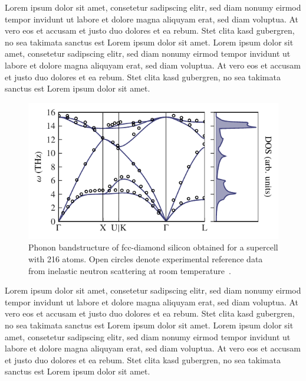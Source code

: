 Lorem ipsum dolor sit amet, consetetur sadipscing elitr, sed diam nonumy eirmod tempor invidunt ut labore et dolore magna aliquyam erat, sed diam voluptua. At vero eos et accusam et justo duo dolores et ea rebum. Stet clita kasd gubergren, no sea takimata sanctus est Lorem ipsum dolor sit amet. Lorem ipsum dolor sit amet, consetetur sadipscing elitr, sed diam nonumy eirmod tempor invidunt ut labore et dolore magna aliquyam erat, sed diam voluptua. At vero eos et accusam et justo duo dolores et ea rebum. Stet clita kasd gubergren, no sea takimata sanctus est Lorem ipsum dolor sit amet.


\begin{figure}
	\includegraphics[width=\textwidth]{./data/plots/anharmonicity/3_bandstructures/Si/bands_dos_emb.pdf}
	\caption{
		Phonon bandstructure of fcc-diamond silicon obtained for a supercell with 216 atoms. Open circles denote experimental reference data from inelastic neutron scattering at room temperature~\cite{Nilsson1972}.
	}
\end{figure}

Lorem ipsum dolor sit amet, consetetur sadipscing elitr, sed diam nonumy eirmod tempor invidunt ut labore et dolore magna aliquyam erat, sed diam voluptua. At vero eos et accusam et justo duo dolores et ea rebum. Stet clita kasd gubergren, no sea takimata sanctus est Lorem ipsum dolor sit amet. Lorem ipsum dolor sit amet, consetetur sadipscing elitr, sed diam nonumy eirmod tempor invidunt ut labore et dolore magna aliquyam erat, sed diam voluptua. At vero eos et accusam et justo duo dolores et ea rebum. Stet clita kasd gubergren, no sea takimata sanctus est Lorem ipsum dolor sit amet.

